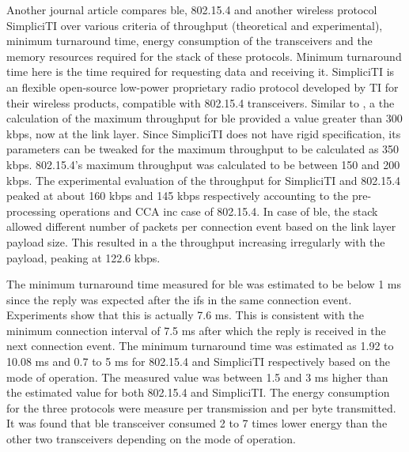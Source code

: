 Another journal article \cite{Mikhaylov2013} compares \gls{ble}, 802.15.4 and another wireless protocol SimpliciTI over various criteria of throughput (theoretical and experimental), minimum turnaround time, energy consumption of the transceivers and the memory resources required for the stack of these protocols. Minimum turnaround time here is the time required for requesting data and receiving it. SimpliciTI is an flexible open-source low-power proprietary radio protocol developed by TI for their wireless products, compatible with 802.15.4 transceivers. Similar to \cite{Gomez2011}, a the calculation of the maximum throughput for \gls{ble} provided a value greater than 300 kbps, now at the link layer. Since SimpliciTI does not have rigid specification, its parameters can be tweaked for the maximum throughput to be calculated as 350 kbps. 802.15.4's maximum throughput was calculated to be between 150 and 200 kbps. The experimental evaluation of the throughput for SimpliciTI and 802.15.4 peaked at about 160 kbps and 145 kbps respectively accounting to the pre-processing operations and CCA inc case of 802.15.4. In case of \gls{ble}, the stack allowed different number of packets per connection event based on the link layer payload size. This resulted in a the throughput increasing irregularly with the payload, peaking at 122.6 kbps.

The minimum turnaround time measured for \gls{ble} was estimated to be below 1 ms since the reply was expected after the \gls{ifs} in the same connection event. Experiments show that this is actually 7.6 ms. This is consistent with the minimum connection interval of 7.5 ms after which the reply is received in the next connection event. The minimum turnaround time was estimated as 1.92 to 10.08 ms and 0.7 to 5 ms for 802.15.4 and SimpliciTI respectively based on the mode of operation. The measured value was between 1.5 and 3 ms higher than the estimated value for both 802.15.4 and SimpliciTI. The energy consumption for the three protocols were measure per transmission and per byte transmitted. It was found that \gls{ble} transceiver consumed 2 to 7 times lower energy than the other two transceivers depending on the mode of operation.

